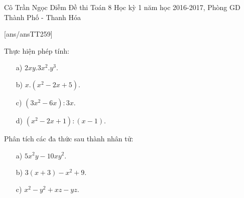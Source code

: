 	\begin{name}
		{Cô Trần Ngọc Diễm}
		{Đề thi Toán 8 Học kỳ 1 năm học 2016-2017, Phòng GD Thành Phố - Thanh Hóa}
	\end{name}
	\setcounter{ex}{0}
	[ans/ansTT259]
	\begin{ex}%
		Thực hiện phép tính:
		\begin{enumerate}
			\item  [a)] $2xy.3x^2.y^3$.
			\item [b)] $x.(x^2-2x+5)$.
			\item [c)] $(3x^2-6x):3x$.
			\item [d)] $(x^2-2x+1):(x-1)$.
		\end{enumerate}
	\end{ex}
	\begin{ex}%
		Phân tích các đa thức sau thành nhân tử:
		\begin{enumerate}
			\item  [a)] $5x^2y-10xy^2$.
			\item [b)] $3(x+3)-x^2+9$.
			\item [c)] $x^2-y^2+xz-yz$.
		\end{enumerate}
	
	\end{ex}
